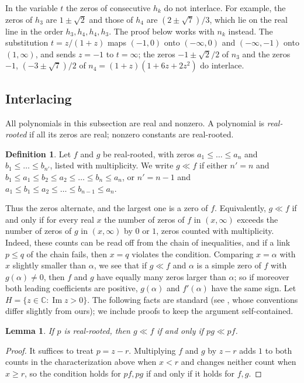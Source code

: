 \documentclass[11pt]{amsart}
\newtheorem{lemma}[theorem]{Lemma}
\theoremstyle{definition}
\newtheorem{definition}[theorem]{Definition}
\newcommand{\C}{\mathbb{C}}
\begin{document}
In the variable $t$ the zeros of consecutive $h_k$ do not interlace. For example, the zeros of $h_3$ are $1\pm\sqrt2$ and those of $h_4$ are $(2\pm\sqrt7)/3$, which lie on the real line in the order $h_3,h_4,h_4,h_3$. The proof below works with $n_k$ instead. The substitution $t=z/(1+z)$ maps $(-1,0)$ onto $(-\infty,0)$ and $(-\infty,-1)$ onto $(1,\infty)$, and sends $z=-1$ to $t=\infty$; the zeros $-1\pm\sqrt2/2$ of $n_3$ and the zeros $-1$, $(-3\pm\sqrt7)/2$ of $n_4=(1+z)(1+6z+2z^2)$ do interlace.

\subsection{Interlacing}
All polynomials in this subsection are real and nonzero. A polynomial is \emph{real-rooted} if all its zeros are real; nonzero constants are real-rooted.

\begin{definition}
Let $f$ and $g$ be real-rooted, with zeros $a_1\le\dots\le a_n$ and $b_1\le\dots\le b_{n'}$, listed with multiplicity. We write $g\ll f$ if either $n'=n$ and $b_1\le a_1\le b_2\le a_2\le\dots\le b_n\le a_n$, or $n'=n-1$ and $a_1\le b_1\le a_2\le\dots\le b_{n-1}\le a_n$.
\end{definition}

Thus the zeros alternate, and the largest one is a zero of $f$. Equivalently, $g\ll f$ if and only if for every real $x$ the number of zeros of $f$ in $(x,\infty)$ exceeds the number of zeros of $g$ in $(x,\infty)$ by $0$ or $1$, zeros counted with multiplicity. Indeed, these counts can be read off from the chain of inequalities, and if a link $p\le q$ of the chain fails, then $x=q$ violates the condition. Comparing $x=\alpha$ with $x$ slightly smaller than $\alpha$, we see that if $g\ll f$ and $\alpha$ is a simple zero of $f$ with $g(\alpha)\ne0$, then $f$ and $g$ have equally many zeros larger than $\alpha$; so if moreover both leading coefficients are positive, $g(\alpha)$ and $f'(\alpha)$ have the same sign. Let $H=\{z\in\C:\operatorname{Im}z>0\}$. The following facts are standard (see \cite{Fisk,Branden}, whose conventions differ slightly from ours); we include proofs to keep the argument self-contained.

\begin{lemma}\label{lem:il-factor}
If $p$ is real-rooted, then $g\ll f$ if and only if $pg\ll pf$.
\end{lemma}

\begin{proof}
It suffices to treat $p=z-r$. Multiplying $f$ and $g$ by $z-r$ adds $1$ to both counts in the characterization above when $x<r$ and changes neither count when $x\ge r$, so the condition holds for $pf,pg$ if and only if it holds for $f,g$.
\end{proof}
\end{document}
